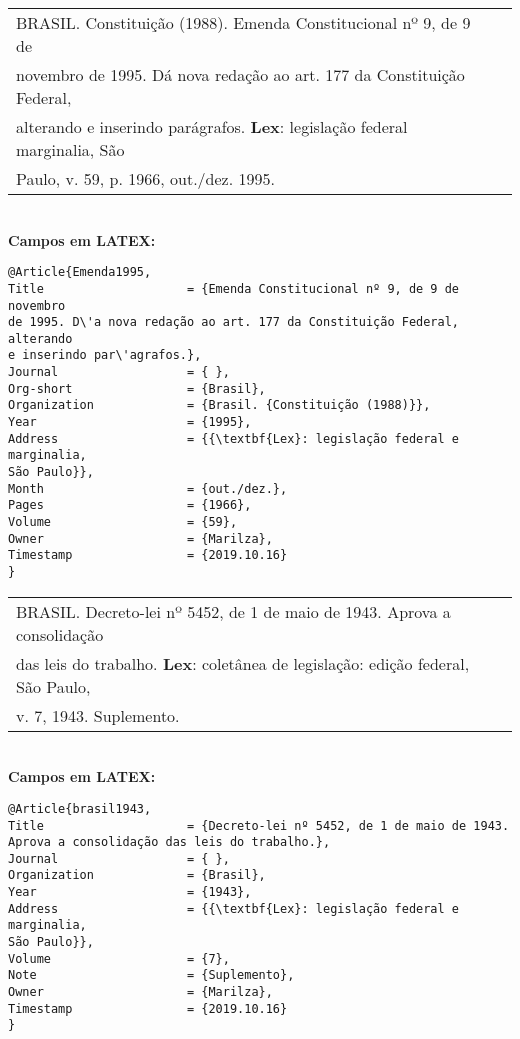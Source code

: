 \begin{tabular}{|l|c|} \hline
	BRASIL. Constituição (1988). Emenda Constitucional 
	nº 9, de 9 de \\novembro de 1995. D\'a nova redação ao art. 177 da Constituição
	Federal,\\ alterando e inserindo par\'agrafos. \textbf{Lex}: legislação federal marginalia, São \\ Paulo, v. 59, p. 1966, out./dez. 1995.  
	\\\hline
\end{tabular} \\

\textbf{Campos em LATEX:} \\

\begin{verbatim}
@Article{Emenda1995,
Title                    = {Emenda Constitucional nº 9, de 9 de novembro 
de 1995. D\'a nova redação ao art. 177 da Constituição Federal, alterando 
e inserindo par\'agrafos.},
Journal                  = { },
Org-short                = {Brasil},
Organization             = {Brasil. {Constituição (1988)}},
Year                     = {1995},
Address                  = {{\textbf{Lex}: legislação federal e marginalia, 
São Paulo}},
Month                    = {out./dez.},
Pages                    = {1966},
Volume                   = {59},
Owner                    = {Marilza},
Timestamp                = {2019.10.16}
}
\end{verbatim}

\begin{tabular}{|l|c|} \hline
	BRASIL. Decreto-lei nº 5452, de 1 de maio de 1943. Aprova a consolidação \\ das leis do trabalho. \textbf{Lex}: colet\^anea de legislação: edição federal, São Paulo, \\ v. 7, 1943. Suplemento.
	\\\hline
\end{tabular} \\

\textbf{Campos em LATEX:} 

\begin{verbatim}
@Article{brasil1943,
Title                    = {Decreto-lei nº 5452, de 1 de maio de 1943. 
Aprova a consolidação das leis do trabalho.},
Journal                  = { },
Organization             = {Brasil},
Year                     = {1943},
Address                  = {{\textbf{Lex}: legislação federal e marginalia, 
São Paulo}},
Volume                   = {7},
Note                     = {Suplemento},
Owner                    = {Marilza},
Timestamp                = {2019.10.16}
}
\end{verbatim}

